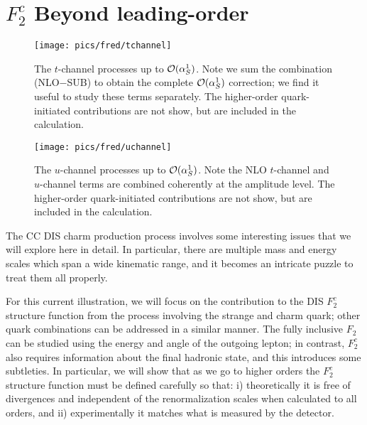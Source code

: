 \clearpage
\newcommand{\xsec}[1]{\vskip 6pt \noindent {\bf #1} \quad }
\appendix
{}

\section{$F_{2}^{c}$ Beyond leading-order}\label{sec:appendix}

\begin{figure*}
  \centering \texttt{[image: pics/fred/tchannel]}
  \caption{The $t$-channel processes up to ${\cal  O}(\alpha_S^1)$.
Note we sum the combination (NLO$-$SUB) to obtain the complete ${\cal  O}(\alpha_S^1)$ correction;
we find it useful to study these terms separately.
The higher-order quark-initiated contributions are not show, but are included in the calculation. 
\label{fig:tchannel}}
\end{figure*}

\begin{figure*}
  \centering \texttt{[image: pics/fred/uchannel]}
\caption{The $u$-channel processes  up to ${\cal  O}(\alpha_S^1)$.
Note the NLO  $t$-channel and $u$-channel terms are combined coherently at the amplitude  level. 
The higher-order quark-initiated contributions are not show, but are included in the calculation. 
\label{fig:uchannel}}
\end{figure*}


\xsec{The multi-scale problem:}
%
The CC DIS charm production process involves some interesting issues
that we will explore here in detail. In particular, there are multiple
mass and energy scales which span a wide kinematic range, and it
becomes an intricate puzzle to treat them all properly.

For this current illustration, we will focus on the contribution to
the DIS $F_{2}^{c}$ structure function from the process involving the
strange and charm quark; other quark combinations can be addressed in
a similar manner.
%
The fully inclusive $F_2$ can be studied using the energy and angle of
the outgoing lepton; in contrast, $F_{2}^{c}$ also requires
information about the final hadronic state, and this introduces some
subtleties.
%
In particular, we will show that as we go to higher orders the
$F_{2}^{c}$ structure function must be defined carefully so that: i)
theoretically it is free of divergences and independent of the
renormalization scales when calculated to all orders, 
and ii) experimentally it matches what is
measured by the detector.

